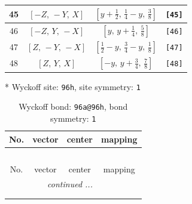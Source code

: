 \documentclass[fleqn,8pt]{jsarticle}
\begin{document}
\begin{longtable}{cccc}
45 & $\left[ - Z,\, - Y,\, X \right]$ & $\left[ y + \frac{1}{2},\, \frac{1}{4} - y,\, \frac{3}{8} \right]$ & {\tt [45]} \\ \hline
46 & $\left[ - Z,\, Y,\, - X \right]$ & $\left[ y,\, y + \frac{1}{4},\, \frac{5}{8} \right]$ & {\tt [46]} \\ \hline
47 & $\left[ Z,\, - Y,\, - X \right]$ & $\left[ \frac{1}{2} - y,\, \frac{3}{4} - y,\, \frac{1}{8} \right]$ & {\tt [47]} \\ \hline
48 & $\left[ Z,\, Y,\, X \right]$ & $\left[ - y,\, y + \frac{3}{4},\, \frac{7}{8} \right]$ & {\tt [48]} \\
\end{longtable}
* Wyckoff site: {\tt 96h}, site symmetry: {\tt 1}
\renewcommand{\arraystretch}{1.2}
\begin{longtable}{cccc}
\caption{Wyckoff bond: {\tt 96a@96h}, bond symmetry: {\tt 1}}
 \\
 \hline \hline
No. & vector & center & mapping \\ \hline \endfirsthead

\multicolumn{3}{l}{\tablename\ \thetable{}} \\
 \hline \hline
No. & vector & center & mapping \\ \hline \endhead

 \hline \hline
\multicolumn{3}{r}{\footnotesize\it continued ...} \\ \endfoot

 \hline \hline
\multicolumn{3}{r}{} \\ \endlastfoot


\end{longtable}
\end{document}
